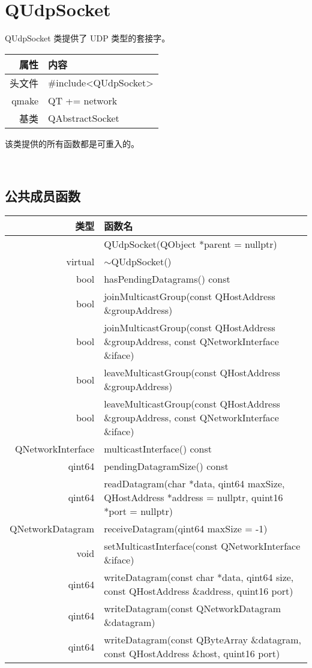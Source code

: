 \chapter{QUdpSocket}

QUdpSocket 类提供了 UDP 类型的套接字。

\begin{tabular}{|r|l|}
	\hline
	属性 & 内容 \\
	\hline
	头文件 & \#include<QUdpSocket>\\      
	\hline
	qmake & QT += network\\ 
	\hline
	基类 	&QAbstractSocket\\     
	\hline
\end{tabular}

\begin{notice}
该类提供的所有函数都是可重入的。
\end{notice}

 	
\section{公共成员函数}

\begin{longtable}[l]{|r|m{30em}|}
	\hline
	类型 	&函数名\\
	\hline
	&QUdpSocket(QObject *parent = nullptr)\\
	\hline
virtual &	$\sim$QUdpSocket()\\
\hline
bool &	hasPendingDatagrams() const\\
\hline
bool 	&joinMulticastGroup(const QHostAddress \&groupAddress)\\
\hline
bool &	joinMulticastGroup(const QHostAddress \&groupAddress, const QNetworkInterface \&iface)\\
\hline
bool &	leaveMulticastGroup(const QHostAddress \&groupAddress)\\
\hline
bool 	&leaveMulticastGroup(const QHostAddress \&groupAddress, const QNetworkInterface \&iface)\\
\hline
QNetworkInterface &	multicastInterface() const\\
\hline
qint64 &	pendingDatagramSize() const\\
\hline
qint64 	&readDatagram(char *data, qint64 maxSize, QHostAddress *address = nullptr, quint16 *port = nullptr)\\
\hline
QNetworkDatagram &	receiveDatagram(qint64 maxSize = -1)\\
\hline
void 	&setMulticastInterface(const QNetworkInterface \&iface)\\
\hline
qint64 &	writeDatagram(const char *data, qint64 size, const QHostAddress \&address, quint16 port)\\
\hline
qint64 	&writeDatagram(const QNetworkDatagram \&datagram)\\
\hline
qint64 &	writeDatagram(const QByteArray \&datagram, const QHostAddress \&host, quint16 port) \\
\hline
\end{longtable}

